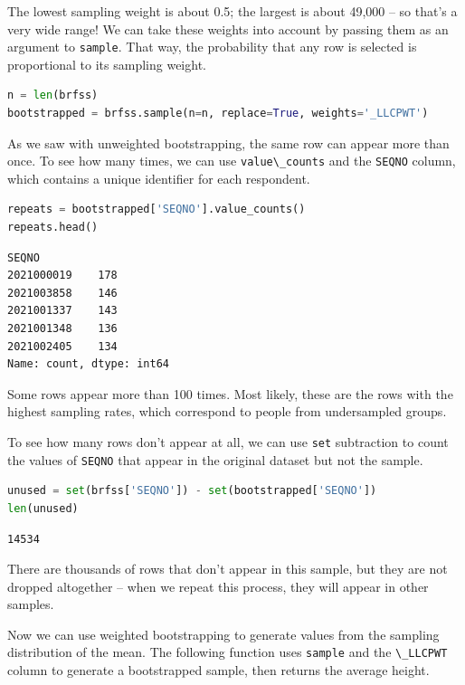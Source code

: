 The lowest sampling weight is about 0.5; the largest is about 49,000 --
so that's a very wide range! We can take these weights into account by
passing them as an argument to \passthrough{\lstinline!sample!}. That
way, the probability that any row is selected is proportional to its
sampling weight.

\begin{lstlisting}[language=Python,style=source]
n = len(brfss)
bootstrapped = brfss.sample(n=n, replace=True, weights='_LLCPWT')
\end{lstlisting}

As we saw with unweighted bootstrapping, the same row can appear more
than once. To see how many times, we can use
\passthrough{\lstinline!value\_counts!} and the
\passthrough{\lstinline!SEQNO!} column, which contains a unique
identifier for each respondent.

\begin{lstlisting}[language=Python,style=source]
repeats = bootstrapped['SEQNO'].value_counts()
repeats.head()
\end{lstlisting}

\begin{lstlisting}[style=output]
SEQNO
2021000019    178
2021003858    146
2021001337    143
2021001348    136
2021002405    134
Name: count, dtype: int64
\end{lstlisting}

Some rows appear more than 100 times. Most likely, these are the rows
with the highest sampling rates, which correspond to people from
undersampled groups.

To see how many rows don't appear at all, we can use
\passthrough{\lstinline!set!} subtraction to count the values of
\passthrough{\lstinline!SEQNO!} that appear in the original dataset but
not the sample.

\begin{lstlisting}[language=Python,style=source]
unused = set(brfss['SEQNO']) - set(bootstrapped['SEQNO'])
len(unused)
\end{lstlisting}

\begin{lstlisting}[style=output]
14534
\end{lstlisting}

There are thousands of rows that don't appear in this sample, but they
are not dropped altogether -- when we repeat this process, they will
appear in other samples.

Now we can use weighted bootstrapping to generate values from the
sampling distribution of the mean. The following function uses
\passthrough{\lstinline!sample!} and the
\passthrough{\lstinline!\_LLCPWT!} column to generate a bootstrapped
sample, then returns the average height.


